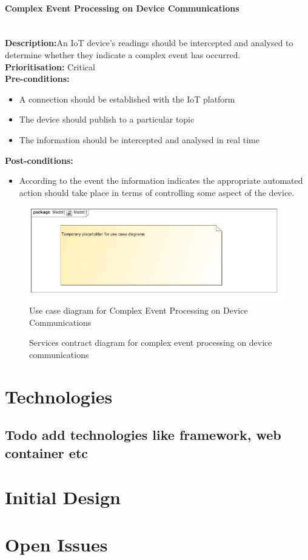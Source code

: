 \documentclass{article}
\begin{document}
	\paragraph{Complex Event Processing on Device Communications}\mbox{}\\
		\textbf{Description:}An IoT device's readings should be intercepted and analysed to determine whether they indicate a complex event has occurred.\\
		\textbf{Prioritisation:} Critical\\		
		\textbf{Pre-conditions:}
			\begin{itemize}
				\item A connection should be established with the IoT platform
				\item The device should publish to a particular topic
				\item The information should be intercepted and analysed in real time
			\end{itemize}
		\textbf{Post-conditions:}
			\begin{itemize}
				\item According to the event the information indicates the appropriate automated action should take place in terms of controlling some aspect of the device.
			\end{itemize}

		\begin{figure}[H]
			\includegraphics[width=\linewidth]{images/tempUseCase.jpg}
			\caption{Use case diagram for Complex Event Processing on Device Communications}
		\end{figure}
		
		\begin{figure}[H]
			\caption{Services contract diagram for complex event processing on device communications}
		\end{figure}	
	
\section{Technologies}

\subsection{Todo add technologies like framework, web container etc}

\section{Initial Design}

\section{Open Issues}
\end{document}
